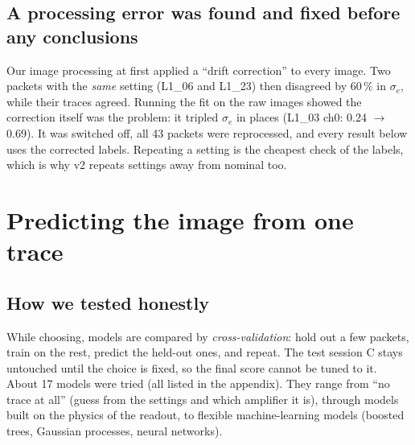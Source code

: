 \documentclass[11pt]{article}
\begin{document}
\subsection{A processing error was found and fixed before any conclusions}
Our image processing at first applied a ``drift correction'' to every image. Two packets with the \emph{same} setting
(L1\_06 and L1\_23) then disagreed by 60\,\% in $\sigma_e$, while their traces agreed. Running the fit on the raw
images showed the correction itself was the problem: it tripled $\sigma_e$ in places (L1\_03 ch0: 0.24 $\to$ 0.69).
It was switched off, all 43 packets were reprocessed, and every result below uses the corrected labels. Repeating a
setting is the cheapest check of the labels, which is why v2 repeats settings away from nominal too.

\section{Predicting the image from one trace}

\subsection{How we tested honestly}
\begin{center}
\end{center}
While choosing, models are compared by \emph{cross-validation}: hold out a few packets, train on the rest, predict
the held-out ones, and repeat. The test session C stays untouched until the choice is fixed, so the final score cannot
be tuned to it. About 17 models were tried (all listed in the appendix). They range from ``no trace at all'' (guess
from the settings and which amplifier it is), through models built on the physics of the readout, to flexible
machine-learning models (boosted trees, Gaussian processes, neural networks).
\end{document}
